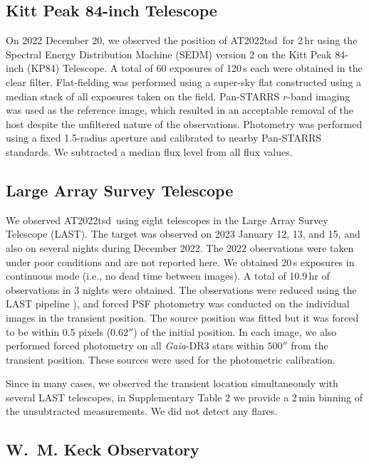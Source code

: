 \documentclass{nature_plusfigure}
\newcommand{\at}{AT2022tsd}
\begin{document}
\begin{methods}
\subsection{Kitt Peak 84-inch Telescope}
\label{sec:kp84}

On 2022 December 20, we observed the position of \at\ for 2\,hr using the Spectral Energy Distribution Machine (SEDM\cite{Blagorodnova2018}) version 2 on the Kitt Peak 84-inch (KP84) Telescope. A total of 60 exposures of 120\,s each were obtained in the clear filter. Flat-fielding was performed using a super-sky flat constructed using a median stack of all exposures taken on the field.  Pan-STARRS $r$-band imaging was used as the reference image, which resulted in an acceptable removal of the host despite the unfiltered nature of the observations.  Photometry was performed using a fixed 1.5\arcsec-radius aperture and calibrated to nearby Pan-STARRS standards. We subtracted a median flux level from all flux values.

\subsection{Large Array Survey Telescope}
\label{sec:last}

We observed \at\ using eight telescopes in the Large Array Survey Telescope (LAST\cite{Ofek2023,BenAmi2023}).
The target was observed on 2023 January 12, 13, and 15, and also on several nights during December 2022.
The 2022 observations were taken under poor conditions and are not reported here.
We obtained 20\,s exposures in continuous mode (i.e., no dead time between images).
A total of 10.9\,hr of observations in 3 nights were obtained.
The observations were reduced using the LAST pipeline \cite{Ofek2014,Ofek2019,Ofek2023}), and forced PSF photometry was conducted on the individual images
in the transient position. 
The source position was fitted but it was forced to be within 0.5 pixels ($0.62''$) of the initial position.
In each image, we also performed forced photometry on all {\it Gaia}-DR3\cite{Gaia2021} stars
within $500''$ from the transient position.
These sources were used for the photometric calibration.

Since in many cases, we observed the transient location simultaneously with several LAST telescopes, in Supplementary Table 2 we provide a 2\,min binning of the unsubtracted measurements. We did not detect any flares.

\subsection{W.~M. Keck Observatory}
\label{sec:keck}


\end{methods}
\end{document}
